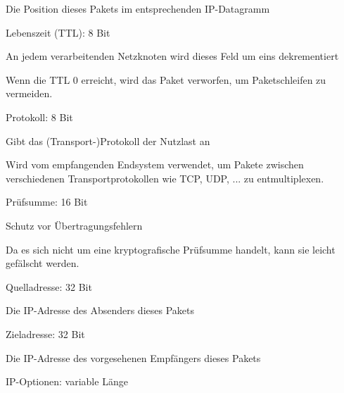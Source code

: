 \documentclass[a4paper]{article}
\begin{document}
\begin{multicols}{3}
\begin{itemize*}
            \begin{itemize*}
                  \item Die Position dieses Pakets im entsprechenden IP-Datagramm
            \end{itemize*}
            \item
            Lebenszeit (TTL): 8 Bit

            \begin{itemize*}
                  \item An jedem verarbeitenden Netzknoten wird dieses Feld um eins dekrementiert
                  \item Wenn die TTL 0 erreicht, wird das Paket verworfen, um Paketschleifen zu vermeiden.
            \end{itemize*}
            \item
            Protokoll: 8 Bit

            \begin{itemize*}
                  \item Gibt das (Transport-)Protokoll der Nutzlast an
                  \item Wird vom empfangenden Endsystem verwendet, um Pakete zwischen verschiedenen Transportprotokollen wie TCP, UDP, ... zu entmultiplexen.
            \end{itemize*}
            \item
            Prüfsumme: 16 Bit

            \begin{itemize*}
                  \item Schutz vor Übertragungsfehlern
                  \item Da es sich nicht um eine kryptografische Prüfsumme handelt, kann sie leicht gefälscht werden.
            \end{itemize*}
            \item
            Quelladresse: 32 Bit

            \begin{itemize*}
                  \item Die IP-Adresse des Absenders dieses Pakets
            \end{itemize*}
            \item
            Zieladresse: 32 Bit

            \begin{itemize*}
                  \item Die IP-Adresse des vorgesehenen Empfängers dieses Pakets
            \end{itemize*}
            \item
            IP-Optionen: variable Länge


\end{itemize*}
\end{multicols}
\end{document}
